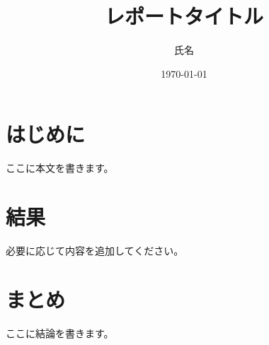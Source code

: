 \documentclass[a4paper,11pt]{ujarticle}
\title{レポートタイトル}
\author{氏名}
\date{\today}
\begin{document}
\maketitle

\section{はじめに}
ここに本文を書きます。

\section{結果}
必要に応じて内容を追加してください。

\section{まとめ}
ここに結論を書きます。
\end{document}
